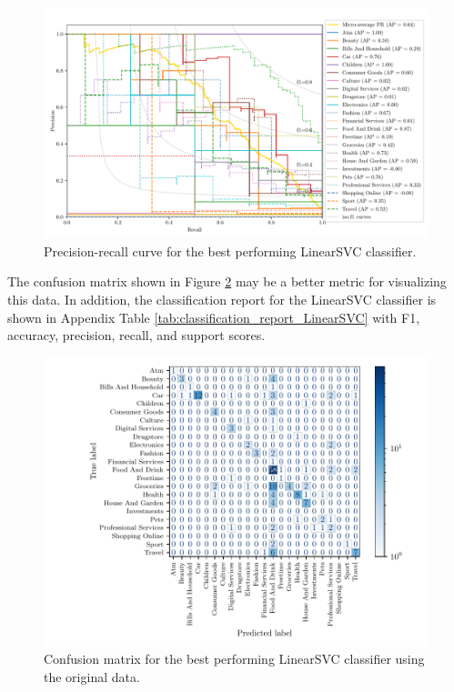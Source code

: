 \begin{figure}[h]
  \centering
  \includegraphics[width=\scale\textwidth]{../img/plot_pr_curve.pdf}
  \caption{Precision-recall curve for the best performing LinearSVC classifier.}
  \label{fig:pr_curve}
\end{figure}

The confusion matrix shown in Figure \ref{fig:confusion_matrix} may be a better metric for visualizing this data. In addition, the classification report for the LinearSVC classifier is shown in Appendix Table \ref{tab:classification_report_LinearSVC} with F1, accuracy, precision, recall, and support scores.

\begin{figure}[h]
  \centering
  \includegraphics[width=\scale\textwidth]{../img/plot_cm_LinearSVC.pdf}
  \caption{Confusion matrix for the best performing LinearSVC classifier using the original data.}
  \label{fig:confusion_matrix}
\end{figure}


